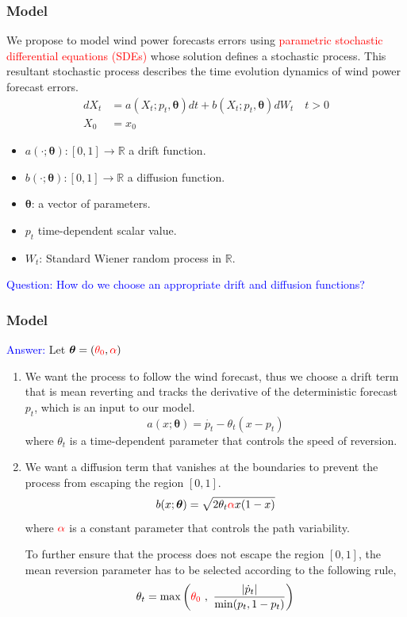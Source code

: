 \documentclass[aspectratio=169]{beamer}\usepackage[utf8]{inputenc}
\newcommand{\R}{\mathbb{R}}
\begin{document}
\begin{frame}\frametitle{Model}
We propose to model wind power forecasts errors using \textcolor{red}{parametric stochastic differential equations (SDEs)} whose solution defines a stochastic process. This resultant stochastic process describes the time evolution dynamics of wind power forecast errors.
\begin{equation}
\begin{split}
dX_t &= a(X_t; p_t,\bm{\theta}) dt + b (X_t;p_t, \bm{\theta} ) dW_t \quad t > 0 \\
X_0 & = x_0
\end{split}
\label{main}
\end{equation}

\begin{itemize}
\item $a(\cdot; \bm{\theta}):[0,1] \to \R $  a drift function.
\item $b (\cdot; \bm{\theta} ):[0,1] \to \R$  a  diffusion function.
\item $\bm{\theta}$: a vector of parameters.
\item $p_t$ time-dependent scalar value.
\item $W_t$: Standard Wiener random process in $\R$.
\end{itemize}

\textcolor{blue}{Question: How do we choose an appropriate drift and diffusion functions?}

\end{frame}


\begin{frame}\frametitle{Model}
\textcolor{blue}{Answer:}
Let $\bm{\theta} = (\textcolor{red}{\theta_0}, \textcolor{red}{\alpha})$
\begin{enumerate}
  \item We want the process to follow the wind forecast, thus we choose a drift term that is mean reverting and tracks the derivative of the deterministic forecast $p_t$, which is an input to our model.
  \begin{equation}
    a(x; \bm{\theta})=  \dot{p_t} - \theta_t(x - p_t)
  \end{equation}
where $\theta_t$ is a time-dependent parameter that controls the speed of reversion.
  \item We want a diffusion term that vanishes at the boundaries to prevent the process from escaping the region $[0,1]$.
  \begin{equation}
    b (x; \bm{\theta} )= \sqrt{2 \theta_t \textcolor{red}{\textcolor{red}{\alpha}} x (1-x)}
  \end{equation}
  where $\textcolor{red}{\alpha}$ is a constant parameter that controls the path variability.

To further ensure that the process does not escape the region $[0,1]$, the mean reversion parameter has to be selected according to the following rule,
\begin{equation}
\theta_t = \max \left( \textcolor{red}{\theta_0} \ , \ \frac{|\dot{p}_t|}{\min (p_t, 1-p_t)}  \right ) \label{theta_t}
\end{equation}
\end{enumerate}
\end{frame}
\end{document}
